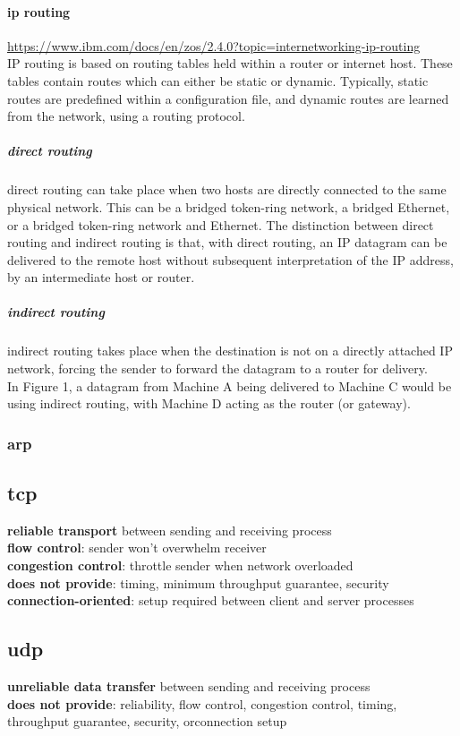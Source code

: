 \documentclass[a4paper,12pt]{article}
\begin{document}
\paragraph{ip routing}
\label{sec:org037b655}
\url{https://www.ibm.com/docs/en/zos/2.4.0?topic=internetworking-ip-routing}\\
IP routing is based on routing tables held within a router or internet host. These tables contain routes which can either be static or dynamic. Typically, static routes are predefined within a configuration file, and dynamic routes are learned from the network, using a routing protocol.\\
\subparagraph{direct routing}
\label{sec:org81ec060}
direct routing can take place when two hosts are directly connected to the same physical network. This can be a bridged token-ring network, a bridged Ethernet, or a bridged token-ring network and Ethernet. The distinction between direct routing and indirect routing is that, with direct routing, an IP datagram can be delivered to the remote host without subsequent interpretation of the IP address, by an intermediate host or router.\\
\subparagraph{indirect routing}
\label{sec:org06ed3c0}
indirect routing takes place when the destination is not on a directly attached IP network, forcing the sender to forward the datagram to a router for delivery.\\
In Figure 1, a datagram from Machine A being delivered to Machine C would be using indirect routing, with Machine D acting as the router (or gateway).\\
\subsubsection{arp}
\label{sec:orgeef309a}
\subsection{tcp}
\label{sec:org287582b}
\textbf{reliable transport} between sending and receiving process\\
\textbf{flow control}: sender won’t overwhelm receiver\\
\textbf{congestion control}: throttle sender when network overloaded\\
\textbf{does not provide}: timing, minimum throughput guarantee, security\\
\textbf{connection-oriented}: setup required between client and server processes\\
\subsection{udp}
\label{sec:org2a32546}
\textbf{unreliable data transfer} between sending and receiving process\\
\textbf{does not provide}: reliability, flow control, congestion control, timing, throughput guarantee, security, orconnection setup\\
\end{document}
